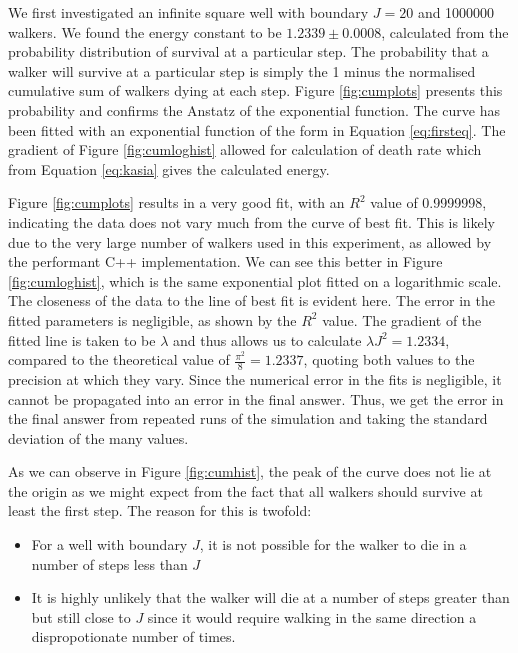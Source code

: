 \documentclass[journal]{IEEEtran}
\begin{document}

We first investigated an infinite square well with boundary $J=20$ and 1000000
walkers. We found the energy constant to be $1.2339 \pm 0.0008$, calculated from
the probability distribution of survival at a particular step. The probability
that a walker will survive at a particular step is simply the 1 minus the
normalised cumulative sum of walkers dying at each step. Figure
\ref{fig:cumplots} presents this probability and confirms the Anstatz of the
exponential function. The curve has been fitted with an exponential function of
the form in Equation \ref{eq:firsteq}. The gradient of Figure
\ref{fig:cumloghist} allowed for calculation of death rate which from Equation
\ref{eq:kasia} gives the calculated energy.

Figure \ref{fig:cumplots} results in a very good fit, with an $R^2$ value of
0.9999998, indicating the data does not vary much from the curve of best
fit. This is likely due to the very large number of walkers used in this
experiment, as allowed by the performant C++ implementation.  We can see this
better in Figure \ref{fig:cumloghist}, which is the same exponential plot fitted
on a logarithmic scale. The closeness of the data to the line of best fit is
evident here. The error in the fitted parameters is negligible, as shown by the
$R^2$ value. The gradient of the fitted line is taken to be $\lambda$ and thus
allows us to calculate $\lambda J^2 = 1.2334$, compared to the theoretical value
of $\frac{\pi^2}{8} = 1.2337$, quoting both values to the precision at which
they vary. Since the numerical error in the fits is negligible, it cannot be
propagated into an error in the final answer. Thus, we get the error in the
final answer from repeated runs of the simulation and taking the standard
deviation of the many values.

As we can observe in Figure \ref{fig:cumhist}, the peak of the curve does not
lie at the origin as we might expect from the fact that all walkers should
survive at least the first step. The reason for this is twofold:
\begin{itemize}
\item For a well with boundary $J$, it is not possible for the walker to die in
  a number of steps less than $J$
\item It is highly unlikely that the walker will die at a number of steps
  greater than but still close to $J$ since it would require walking in the same
  direction a dispropotionate number of times.
\end{itemize}
\end{document}
